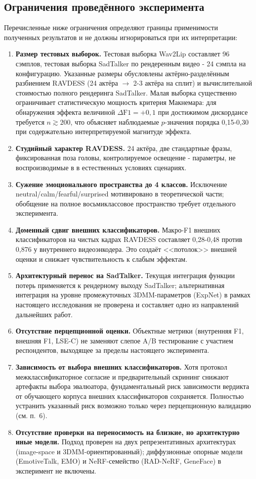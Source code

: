 \documentclass[a4paper, 12pt, oneside, openany]{article}
\begin{document}
\subsection{Ограничения проведённого эксперимента}

Перечисленные ниже ограничения определяют границы применимости полученных результатов и не должны игнорироваться при их интерпретации:
\begin{enumerate}
\item \textbf{Размер тестовых выборок.} Тестовая выборка Wav2Lip составляет 96 сэмплов, тестовая выборка SadTalker по рендеренным видео - 24 сэмпла на конфигурацию. Указанные размеры обусловлены актёрно-разделённым разбиением RAVDESS (24 актёра $\to$ 2-3 актёра на сплит) и вычислительной стоимостью полного рендеринга SadTalker. Малая выборка существенно ограничивает статистическую мощность критерия Макнемара: для обнаружения эффекта величиной $\Delta\text{F1}=+0{,}1$ при достижимом дискордансе требуется $n \gtrsim 200$, что объясняет наблюдаемые $p$-значения порядка 0,15-0,30 при содержательно интерпретируемой магнитуде эффекта.
\item \textbf{Студийный характер RAVDESS.} 24 актёра, две стандартные фразы, фиксированная поза головы, контролируемое освещение - параметры, не воспроизводимые в в естественных условиях сценариях.
\item \textbf{Сужение эмоционального пространства до 4 классов.} Исключение neutral/calm/fearful/surprised мотивировано в теоретической части; обобщение на полное восьмиклассовое пространство требует отдельного эксперимента.
\item \textbf{Доменный сдвиг внешних классификаторов.} Макро-F1 внешних классификаторов на чистых кадрах RAVDESS составляет 0,28-0,48 против 0,876 у внутреннего видеоэнкодера. Это создаёт <<потолок>> внешней оценки и снижает чувствительность к слабым эффектам.
\item \textbf{Архитектурный перенос на SadTalker.} Текущая интеграция функции потерь применяется к рендерному выходу SadTalker; альтернативная интеграция на уровне промежуточных 3DMM-параметров (ExpNet) в рамках настоящего исследования не проверена и составляет одно из направлений дальнейших работ.
\item \textbf{Отсутствие перцепционной оценки.} Объектные метрики (внутренняя F1, внешняя F1, LSE-C) не заменяют слепое A/B тестирование с участием респондентов, выходящее за пределы настоящего эксперимента.
\item \textbf{Зависимость от выбора внешних классификаторов.} Хотя протокол межклассификаторное согласие и предварительный скрининг снижают артефакты выбора эвалюатора, фундаментальный риск зависимости вердикта от обучающего корпуса внешних классификаторов сохраняется. Полностью устранить указанный риск возможно только через перцепционную валидацию (см. п.~6).
\item \textbf{Отсутствие проверки на переносимость на близкие, но архитектурно иные модели.} Подход проверен на двух репрезентативных архитектурах (image-space и 3DMM-ориентированный); диффузионные опорные модели (EmotiveTalk, EMO) и NeRF-семейство (RAD-NeRF, GeneFace) в эксперимент не включены.
\end{enumerate}
\end{document}
